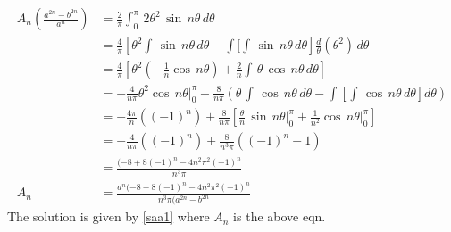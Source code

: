 \begin{align*}
A_n\left(\frac{a^{2n}-b^{2n}}{a^n}\right)&=\frac{2}{\pi}\int_0^\pi\,2\theta^2\,\sin\,n\theta\,d\theta\\
&=\frac{4}{\pi}\left[\theta^2\int\,\sin\,n\theta\,d\theta-\int[\int\,\sin\,n\theta\,d\theta\right]\frac{d}{\theta}(\theta^2)\,d\theta\\
&=\frac{4}{\pi}\left[\theta^2(-\frac{1}{n}\cos\,n\theta)+\frac{2}{n}\int\,\theta\,\cos\,n\theta\,d\theta\right]\\
&=-\frac{4}{n\pi}\theta^2\cos\,n\theta\big|_0^\pi+\frac{8}{n\pi}\left(\theta\,\int\,\cos\,n\theta\,d\theta-\int[\int\,\cos\,n\theta\,d\theta]d\theta\right)\\
&=-\frac{4\pi}{n}((-1)^n)+\frac{8}{n\pi}[\frac{\theta}{n}\,\sin\,n\theta\big|_0^\pi+\frac{1}{n^2}\cos\,n\theta\big|_0^\pi]\\
&=-\frac{4}{n\pi}((-1)^n)+\frac{8}{n^3\pi}((-1)^n-1)\\
&=\frac{(-8+8(-1)^n-4n^2\pi^2(-1)^n}{n^3\pi}\\
A_n&=\frac{a^n(-8+8(-1)^n-4n^2\pi^2(-1)^n}{n^3\pi(a^{2n}-b^{2n}}
\end{align*}The solution is given by \eqref{saa1} where $A_n$ is the above eqn.
